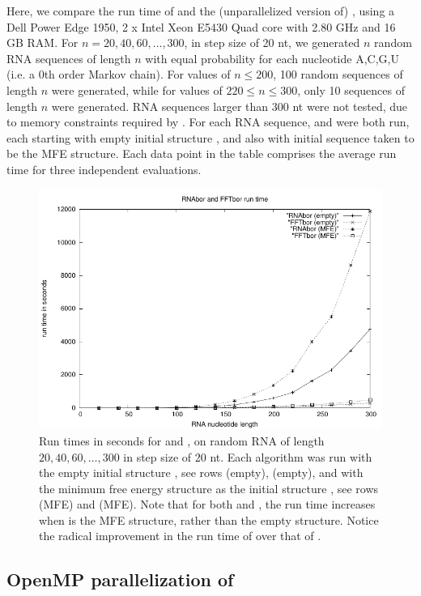 Here, we compare the run time of \rnabor \citep{Freyhult.b07} and
the (unparallelized version of) \fftbor, using
a Dell Power Edge 1950, 2 x Intel Xeon E5430 Quad
core with 2.80 GHz and 16 GB RAM. For $n = 20,40,60,\dots,300$, in step
size of 20 nt, we generated $n$ random RNA sequences of length $n$ with equal
probability for each nucleotide A,C,G,U (i.e. a $0$th order Markov chain).
For values of $n \leq 200$, 100 random sequences of length
$n$ were generated, while for values of $220 \leq n \leq 300$, only
10 sequences of length $n$ were generated.
RNA sequences larger than 300 nt were not tested,
due to  memory constraints required by \rnabor.
For each RNA sequence, \rnabor and \fftbor were both run,
each starting with empty initial structure \strSt, and also
with initial sequence \strSt taken to be the MFE structure.
Each data point in the table comprises the average run time for three
independent evaluations.

\begin{figure}[!ht]
\centering
\includegraphics[width=.9\textwidth]{Figures/FFTbor/benchmarking.pdf}
\caption{Run times in seconds for \rnabor and \fftbor, on random RNA
of length $20,40,60,\dots,300$ in step size of 20 nt. Each algorithm
was run with the empty initial structure \strSt, see rows
\rnabor (empty), \fftbor (empty), and with the minimum free
energy structure as the initial structure \strSt, see rows
\rnabor (MFE) and \fftbor (MFE). Note that for both \rnabor
and \fftbor, the run time increases when \strSt is the MFE structure,
rather than the empty structure. Notice the radical improvement in the
run time of \fftbor over that of \rnabor.
}
\label{fig:fftbor:benchmarking}
\end{figure}

\subsection{OpenMP parallelization of \fftbor}
\label{subsec:fftbor:openmp}

